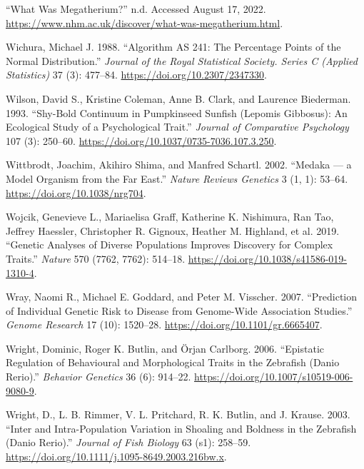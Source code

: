 \documentclass[
]{book}
\newlength{\cslhangindent}
\newlength{\cslentryspacingunit} %
\newenvironment{CSLReferences}[2] %
 {%
  \setlength{\parindent}{0pt}
  \ifodd #1
  \let\oldpar\par
  \def\par{\hangindent=\cslhangindent\oldpar}
  \fi
  \setlength{\parskip}{#2\cslentryspacingunit}
 }%
 {}
\begin{document}
\begin{CSLReferences}{1}{0}
\leavevmode{}%
{``What Was {Megatherium}?''} n.d. Accessed August 17, 2022. \url{https://www.nhm.ac.uk/discover/what-was-megatherium.html}.

\leavevmode{}%
Wichura, Michael J. 1988. {``Algorithm {AS} 241: {The Percentage Points} of the {Normal Distribution}.''} \emph{Journal of the Royal Statistical Society. Series C (Applied Statistics)} 37 (3): 477--84. \url{https://doi.org/10.2307/2347330}.

\leavevmode{}%
Wilson, David S., Kristine Coleman, Anne B. Clark, and Laurence Biederman. 1993. {``Shy-Bold Continuum in Pumpkinseed Sunfish ({Lepomis} Gibbosus): {An} Ecological Study of a Psychological Trait.''} \emph{Journal of Comparative Psychology} 107 (3): 250--60. \url{https://doi.org/10.1037/0735-7036.107.3.250}.

\leavevmode{}%
Wittbrodt, Joachim, Akihiro Shima, and Manfred Schartl. 2002. {``Medaka --- a Model Organism from the Far East.''} \emph{Nature Reviews Genetics} 3 (1, 1): 53--64. \url{https://doi.org/10.1038/nrg704}.

\leavevmode{}%
Wojcik, Genevieve L., Mariaelisa Graff, Katherine K. Nishimura, Ran Tao, Jeffrey Haessler, Christopher R. Gignoux, Heather M. Highland, et al. 2019. {``Genetic Analyses of Diverse Populations Improves Discovery for Complex Traits.''} \emph{Nature} 570 (7762, 7762): 514--18. \url{https://doi.org/10.1038/s41586-019-1310-4}.

\leavevmode{}%
Wray, Naomi R., Michael E. Goddard, and Peter M. Visscher. 2007. {``Prediction of Individual Genetic Risk to Disease from Genome-Wide Association Studies.''} \emph{Genome Research} 17 (10): 1520--28. \url{https://doi.org/10.1101/gr.6665407}.

\leavevmode{}%
Wright, Dominic, Roger K. Butlin, and Örjan Carlborg. 2006. {``Epistatic Regulation of Behavioural and Morphological Traits in the Zebrafish ({Danio} Rerio).''} \emph{Behavior Genetics} 36 (6): 914--22. \url{https://doi.org/10.1007/s10519-006-9080-9}.

\leavevmode{}%
Wright, D., L. B. Rimmer, V. L. Pritchard, R. K. Butlin, and J. Krause. 2003. {``Inter and Intra-Population Variation in Shoaling and Boldness in the Zebrafish ({Danio} Rerio).''} \emph{Journal of Fish Biology} 63 (s1): 258--59. \url{https://doi.org/10.1111/j.1095-8649.2003.216bw.x}.


\end{CSLReferences}
\end{document}

